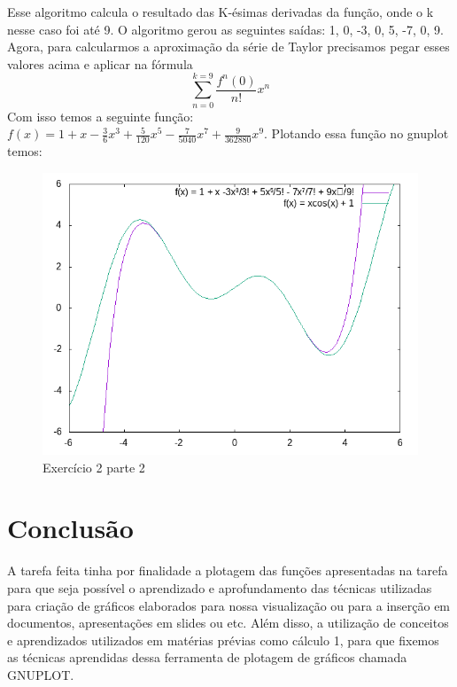 \documentclass{article}
\begin{document}
    
    \hspace{1cm}Esse algoritmo calcula o resultado das K-ésimas derivadas da função, onde o k nesse caso foi até 9. O algoritmo gerou as seguintes saídas: 1, 0, -3, 0, 5, -7, 0, 9.
    Agora, para calcularmos a aproximação da série de Taylor precisamos pegar esses valores acima e aplicar na fórmula $$\sum_{n=0}^{k=9} \frac{f^n(0)}{n!} x^n$$
    \hspace{1cm}Com isso temos a seguinte função: $f(x) = 1 + x - \frac{3}{6}x^3 + \frac{5}{120}x^5 - \frac{7}{5040}x^7 + \frac{9}{362880}x^9$.
    Plotando essa função no gnuplot temos:
    \begin{figure}[!h]
       \centering %
        \includegraphics[scale=0.71]{exercicio2part2.png}
        \caption{Exercício 2 parte 2}
        \label{img:Exercício 2 parte 2}
    \end{figure}
    
\section*{Conclusão}
\hspace{1cm}A tarefa feita tinha por finalidade a plotagem das funções apresentadas na tarefa para que seja possível o aprendizado e aprofundamento das técnicas utilizadas para criação de gráficos elaborados para nossa visualização ou para a inserção em documentos, apresentações em slides ou etc. Além disso, a utilização de conceitos e aprendizados utilizados em matérias prévias como cálculo 1, para que fixemos as técnicas aprendidas dessa ferramenta de plotagem de gráficos chamada GNUPLOT.
\end{document}
